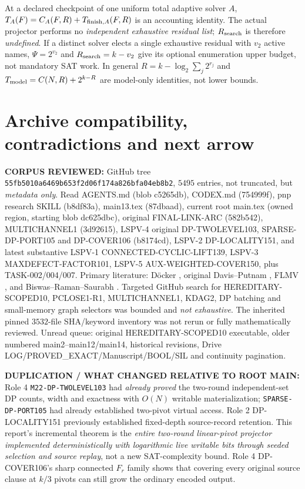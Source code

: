 \documentclass[11pt]{article}
\begin{document}
At a declared checkpoint of one uniform total adaptive solver $A$, $T_A(F)=C_A(F,R)+T_{{\rm finish},A}(F,R)$ is an accounting identity. The actual projector performs no \emph{independent exhaustive residual list}; $R_{\rm search}$ is therefore \emph{undefined}. If a distinct solver elects a single exhaustive residual with $v_2$ active names, $\Psi=2^{v_2}$ and $R_{\rm search}=k-v_2$ give its optional enumeration upper budget, not mandatory SAT work. In general $R=k-\log_2\sum_j2^{r_j}$ and $T_{\rm model}=C(N,R)+2^{k-R}$ are model-only identities, not lower bounds.

\section{Archive compatibility, contradictions and next arrow}
\textbf{CORPUS REVIEWED:} GitHub tree \texttt{55fb5010a6469b653f2d06f174a826bfa04eb8b2}, $5495$ entries, not truncated, but \emph{metadata only}. Read AGENTS.md (blob c5265db), CODEX.md (754999f), pnp research SKILL (b8df83a), main13.tex (87dbaad), current root main.tex (owned region, starting blob dc625dbc), original FINAL-LINK-ARC (582b542), MULTICHANNEL1 (3d92615), LSPV-4 original DP-TWOLEVEL103, SPARSE-DP-PORT105 and DP-COVER106 (b8174cd), LSPV-2 DP-LOCALITY151, and latest substantive LSPV-1 CONNECTED-CYCLIC-LIFT139, LSPV-3 MAXDEFECT-FACTOR101, LSPV-5 AUX-WEIGHTED-COVER150, plus TASK-002/004/007. Primary literature: D\"ocker \cite{docker}, original Davis--Putnam \cite{dp}, FLMV \cite{flmv}, and Biswas--Raman--Saurabh \cite{biswas}. Targeted GitHub search for HEREDITARY-SCOPED10, PCLOSE1-R1, MULTICHANNEL1, KDAG2, DP batching and small-memory graph selectors was bounded and \emph{not exhaustive}. The inherited pinned $3532$-file SHA/keyword inventory was not rerun or fully mathematically reviewed. Unread queue: original HEREDITARY-SCOPED10 executable, older numbered main2--main12/main14, historical revisions, Drive LOG/PROVED\_EXACT/Manuscript/BOOL/SIL and continuity pagination.

\textbf{DUPLICATION / WHAT CHANGED RELATIVE TO ROOT MAIN:} Role 4 \texttt{M22-DP-TWOLEVEL103} had \emph{already proved} the two-round independent-set DP counts, width and exactness with $O(N)$ writable materialization; \texttt{SPARSE-DP-PORT105} had already established two-pivot virtual access. Role 2 DP-LOCALITY151 previously established fixed-depth source-record retention. This report's incremental theorem is the \emph{entire two-round linear-pivot projector implemented deterministically with logarithmic live writable bits through seeded selection and source replay}, not a new SAT-complexity bound. Role 4 DP-COVER106's sharp connected $F_r$ family shows that covering every original source clause at $k/3$ pivots can still grow the ordinary encoded output.
\end{document}
